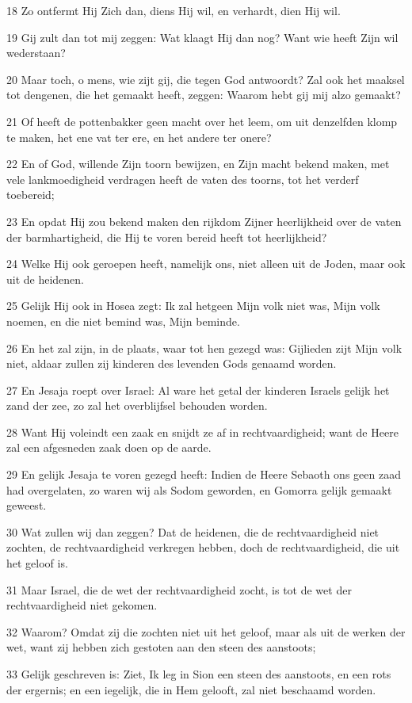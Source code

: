 \par 18 Zo ontfermt Hij Zich dan, diens Hij wil, en verhardt, dien Hij wil.
\par 19 Gij zult dan tot mij zeggen: Wat klaagt Hij dan nog? Want wie heeft Zijn wil wederstaan?
\par 20 Maar toch, o mens, wie zijt gij, die tegen God antwoordt? Zal ook het maaksel tot dengenen, die het gemaakt heeft, zeggen: Waarom hebt gij mij alzo gemaakt?
\par 21 Of heeft de pottenbakker geen macht over het leem, om uit denzelfden klomp te maken, het ene vat ter ere, en het andere ter onere?
\par 22 En of God, willende Zijn toorn bewijzen, en Zijn macht bekend maken, met vele lankmoedigheid verdragen heeft de vaten des toorns, tot het verderf toebereid;
\par 23 En opdat Hij zou bekend maken den rijkdom Zijner heerlijkheid over de vaten der barmhartigheid, die Hij te voren bereid heeft tot heerlijkheid?
\par 24 Welke Hij ook geroepen heeft, namelijk ons, niet alleen uit de Joden, maar ook uit de heidenen.
\par 25 Gelijk Hij ook in Hosea zegt: Ik zal hetgeen Mijn volk niet was, Mijn volk noemen, en die niet bemind was, Mijn beminde.
\par 26 En het zal zijn, in de plaats, waar tot hen gezegd was: Gijlieden zijt Mijn volk niet, aldaar zullen zij kinderen des levenden Gods genaamd worden.
\par 27 En Jesaja roept over Israel: Al ware het getal der kinderen Israels gelijk het zand der zee, zo zal het overblijfsel behouden worden.
\par 28 Want Hij voleindt een zaak en snijdt ze af in rechtvaardigheid; want de Heere zal een afgesneden zaak doen op de aarde.
\par 29 En gelijk Jesaja te voren gezegd heeft: Indien de Heere Sebaoth ons geen zaad had overgelaten, zo waren wij als Sodom geworden, en Gomorra gelijk gemaakt geweest.
\par 30 Wat zullen wij dan zeggen? Dat de heidenen, die de rechtvaardigheid niet zochten, de rechtvaardigheid verkregen hebben, doch de rechtvaardigheid, die uit het geloof is.
\par 31 Maar Israel, die de wet der rechtvaardigheid zocht, is tot de wet der rechtvaardigheid niet gekomen.
\par 32 Waarom? Omdat zij die zochten niet uit het geloof, maar als uit de werken der wet, want zij hebben zich gestoten aan den steen des aanstoots;
\par 33 Gelijk geschreven is: Ziet, Ik leg in Sion een steen des aanstoots, en een rots der ergernis; en een iegelijk, die in Hem gelooft, zal niet beschaamd worden.

